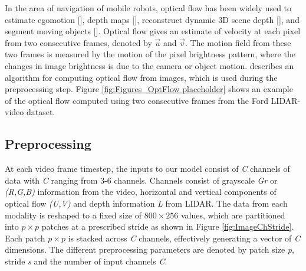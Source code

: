 \documentclass{article}
\begin{document}
In the area of navigation of mobile robots, optical flow has been widely used to estimate egomotion [\cite{Prazdny1980-egomotion-OF}], depth maps [\cite{Shahraray1988-depthestimation-OF}], reconstruct dynamic 3D scene depth [\cite{Yang2012-reconstruction-OF}], and segment moving objects [\cite{Shao2002-seg-OF}]. Optical flow gives an estimate of velocity at each pixel from two consecutive frames, denoted by $\vec{u}$ and $\vec{v}$. The motion field from these two frames is measured by the motion of the pixel brightness pattern, where the changes in image brightness is due to the camera or object motion. \cite{Liu2009Beyond-Pix} describes an algorithm for computing optical flow from images, which is used during the preprocessing step. Figure \ref{fig:Figures_OptFlow placeholder} shows an example of the optical flow computed using two consecutive frames from the Ford LIDAR-video dataset.




\subsection{Preprocessing} %
\label{sub:preprocessing}
At each video frame timestep, the inputs to our model consist of \emph{C} channels of data with \emph{C} ranging from 3-6 channels. Channels consist of grayscale \emph{Gr} or \emph{(R,G,B)} information from the video, horizontal and vertical components of optical flow \emph{(U,V)} and depth information \emph{L} from LIDAR. The data from each modality is reshaped to a fixed size of $800\times256$ values, which are partitioned into $p\times p$ patches at a prescribed stride as shown in Figure \ref{fig:ImageChStride}. Each patch $p\times p$ is stacked across \emph{C} channels, effectively generating a vector of \emph{C} dimensions. The different preprocessing parameters are denoted by patch size \emph{p}, stride \emph{s} and the number of input channels \emph{C}.
\end{document}
